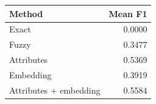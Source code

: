 \begin{tabular}{lr}
\toprule
Method & Mean F1 \\
\midrule
Exact & 0.0000 \\
Fuzzy & 0.3477 \\
Attributes & 0.5369 \\
Embedding & 0.3919 \\
Attributes + embedding & 0.5584 \\
\bottomrule
\end{tabular}
